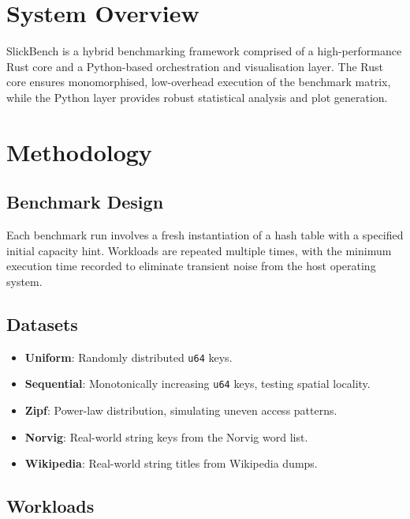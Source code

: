 \documentclass[11pt,a4paper]{article}
\begin{document}
\section{System Overview}

SlickBench is a hybrid benchmarking framework comprised of a high-performance Rust core and a Python-based orchestration and visualisation layer. The Rust core ensures monomorphised, low-overhead execution of the benchmark matrix, while the Python layer provides robust statistical analysis and plot generation.

\section{Methodology}

\subsection{Benchmark Design}

Each benchmark run involves a fresh instantiation of a hash table with a specified initial capacity hint. Workloads are repeated multiple times, with the minimum execution time recorded to eliminate transient noise from the host operating system.

\subsection{Datasets}

\begin{itemize}
  \item \textbf{Uniform}: Randomly distributed \texttt{u64} keys.
  \item \textbf{Sequential}: Monotonically increasing \texttt{u64} keys, testing spatial locality.
  \item \textbf{Zipf}: Power-law distribution, simulating uneven access patterns.
  \item \textbf{Norvig}: Real-world string keys from the Norvig word list.
  \item \textbf{Wikipedia}: Real-world string titles from Wikipedia dumps.
\end{itemize}

\subsection{Workloads}
\end{document}
